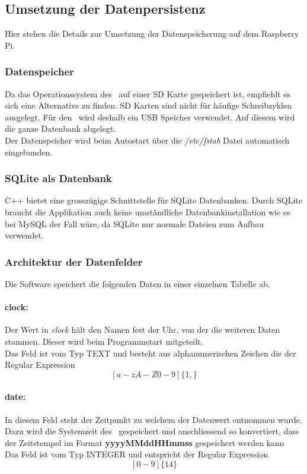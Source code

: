 \subsection{Umsetzung der Datenpersistenz}
    Hier stehen die Details zur Umsetzung der Datenspeicherung auf dem Raspberry Pi.
    \subsubsection{Datenspeicher}
    Da das Operationssystem des \rpi\ auf einer SD Karte gespeichert ist, empfiehlt es sich eine Alternative zu finden. SD Karten sind nicht für häufige Schreibzyklen ausgelegt. Für den \documenttitle\ wird deshalb ein USB Speicher verwendet. Auf diesem wird die ganze Datenbank abgelegt.\\
    Der Datenspeicher wird beim Autostart über die \textit{/etc/fstab} Datei automatisch eingebunden.
    
    \subsubsection{SQLite als Datenbank}
    C++ bietet eine grosszügige Schnittstelle für SQLite Datenbanken. Durch SQLite braucht die Applikation auch keine umständliche Datenbankinstallation wie es bei MySQL der Fall wäre, da SQLite nur normale Dateien zum Aufbau verwendet.
    
    \subsubsection{Architektur der Datenfelder}
    Die Software speichert die folgenden Daten in einer einzelnen Tabelle ab.
    \paragraph{clock:}
    Der Wert in \textit{clock} hält den Namen fest der Uhr, von der die weiteren Daten stammen. Dieser wird beim Programmstart mitgeteilt.\\
    Das Feld ist vom Typ TEXT und besteht aus alphanumerischen Zeichen die der Regular Expression $$[a-zA-Z0-9]\{1,\}$$
    \paragraph{date:}\label{sec:db_date}
    In diesem Feld steht der Zeitpunkt zu welchem der Datenwert entnommen wurde. Dazu wird die Systemzeit des \rpi\ gespeichert und anschliessend so konvertiert, dass der Zeitstempel im Format \textbf{yyyyMMddHHmmss} gespeichert werden kann\\
    Das Feld ist vom Typ INTEGER und entspricht der Regular Expression
    $$[0-9]\{14\}$$
